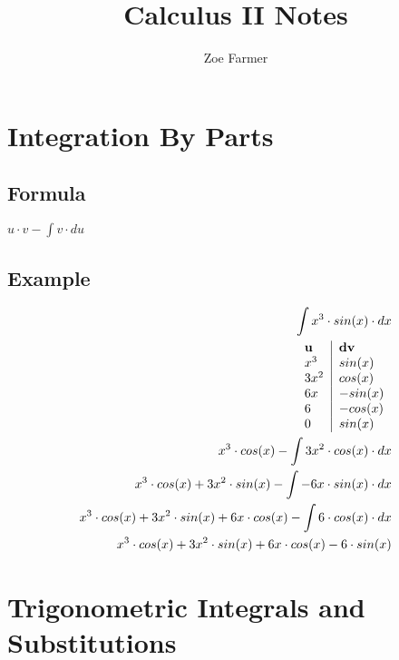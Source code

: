 \documentclass{article}
\begin{document}
\title{Calculus II Notes}
\author{Zoe Farmer}
\maketitle

\section{Integration By Parts}
\subsection*{Formula}
$ u \cdot v-\int v \cdot du $
\subsection*{Example}
\begin{equation}
\begin{aligned}
\int x^3 \cdot sin(x) \cdot dx & \\
\begin{tabular}{l | l}
\textbf{u} & \textbf{dv} \\
$x^3$ & $sin(x)$ \\
$3x^2$ & $cos(x)$ \\
$6x$ & $-sin(x)$ \\
$6$ & $-cos(x)$ \\
$0$ & $sin(x)$ \\
\end{tabular}\\
x^3 \cdot cos(x) - \int 3x^2 \cdot cos(x) \cdot dx & \\
x^3 \cdot cos(x) + 3x^2 \cdot sin(x) - \int -6x \cdot sin(x) \cdot dx & \\
x^3 \cdot cos(x) + 3x^2 \cdot sin(x) + 6x \cdot cos(x) - \int 6 \cdot cos(x) \cdot dx & \\
x^3 \cdot cos(x) + 3x^2 \cdot sin(x) + 6x \cdot cos(x) - 6 \cdot sin(x) & \\
\end{aligned}
\end{equation}

\section{Trigonometric Integrals and Substitutions}
\end{document}
